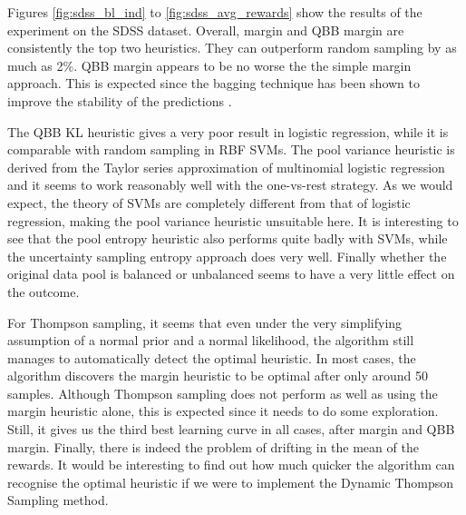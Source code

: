 Figures \ref{fig:sdss_bl_ind} to \ref{fig:sdss_avg_rewards} show the results of the experiment on
the SDSS dataset. Overall, margin and QBB margin are consistently the top two heuristics.
They can outperform random sampling by as much as 2\%. QBB margin appears to be no worse the the
simple margin approach. This is expected since the bagging technique has been shown to improve the
stability of the predictions \cite{breiman96}.

The QBB KL heuristic gives a very poor result in logistic regression, while it is comparable with
random sampling in RBF SVMs. The pool variance heuristic is derived from the Taylor series
approximation of multinomial logistic regression and it seems to work reasonably well with the
one-vs-rest strategy. As we would expect, the theory of SVMs are completely different from that of
logistic regression, making the pool variance heuristic unsuitable here. It is interesting to see
that the pool entropy heuristic also performs quite badly with SVMs, while the uncertainty sampling
entropy approach does very well. Finally whether the original data pool is balanced or unbalanced
seems to have a very little effect on the outcome.

For Thompson sampling, it seems that even under the very simplifying assumption of a normal
prior and a normal likelihood, the algorithm still manages to automatically detect the optimal
heuristic. In most cases, the algorithm discovers the margin heuristic to be optimal after only
around 50 samples. Although Thompson sampling does not perform as well as using the margin heuristic
alone, this is expected since it needs to do some exploration. Still, it gives us the third best
learning curve in all cases, after margin and QBB margin. Finally, there is indeed the problem of
drifting in the mean of the rewards. It would be interesting to find out how much quicker the
algorithm can recognise the optimal heuristic if we were to implement the Dynamic Thompson Sampling
method.


